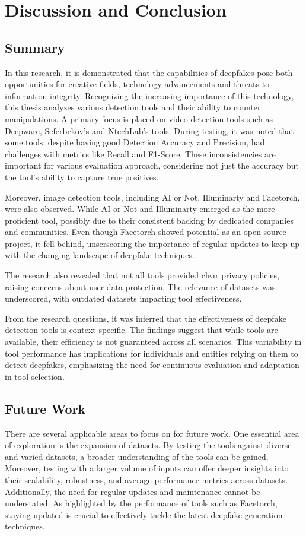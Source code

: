 
\chapter{Discussion and Conclusion}\label{chapter:conclusion}
\section{Summary}
In this research, it is demonstrated that the capabilities of deepfakes pose both
opportunities for creative fields, technology advancements and threats to information
integrity. Recognizing the increasing importance of this technology, this thesis analyzes
various detection tools and their ability to counter manipulations. A primary focus is placed
on video detection tools such as Deepware, Seferbekov's and NtechLab's tools. During testing,
it was noted that some tools, despite having good Detection Accuracy and Precision,
had challenges with metrics like Recall and F1-Score. These inconsistencies are
important for various evaluation approach, considering not just the accuracy but the tool's 
ability to capture true positives.

Moreover, image detection tools, including AI or Not, Illuminarty and Facetorch, were
also observed. While AI or Not and Illuminarty emerged as the more proficient tool,
possibly due to their consistent backing by dedicated companies and communities.
Even though Facetorch showed potential as an open-source project, it fell behind,
unserscoring the importance of regular updates to keep up with the changing landscape
of deepfake techniques.

The research also revealed that not all tools provided clear privacy policies, raising
concerns about user data protection. The relevance of datasets was underscored, with
outdated datasets impacting tool effectiveness.

From the research questions, it was inferred that the effectiveness of deepfake detection
tools is context-specific. The findings suggest that while tools are available, their
efficiency is not guaranteed across all scenarios. This variability in tool performance
has implications for individuals and entities relying on them to detect deepfakes,
emphasizing the need for continuous evaluation and adaptation in tool selection.

\section{Future Work}
There are several applicable areas to focus on for future work. One essential area of
exploration is the expansion of datasets. By testing the tools against diverse and varied
datasets, a broader understanding of the tools can be gained. Moreover, testing with a
larger volume of inputs can offer deeper insights into their scalability, robustness,
and average performance metrics across datasets. Additionally, the need for regular
updates and maintenance cannot be understated. As highlighted by the performance of
tools such as Facetorch, staying updated is crucial to effectively tackle the latest
deepfake generation techniques.

